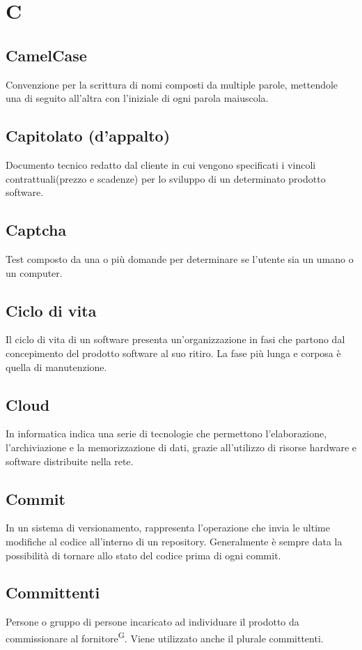 \section{C}

\subsection{CamelCase}
Convenzione per la scrittura di nomi composti da multiple parole, mettendole una di seguito all'altra con l'iniziale di ogni parola maiuscola. 

\subsection{Capitolato (d'appalto)}
Documento tecnico redatto dal cliente in cui vengono specificati i vincoli contrattuali(prezzo e scadenze) per lo sviluppo di un determinato prodotto software.

\subsection{Captcha}
Test composto da una o più domande per determinare se l'utente sia un umano o un computer.

\subsection{Ciclo di vita}
Il ciclo di vita di un software presenta un'organizzazione in fasi che partono dal concepimento del prodotto software al suo ritiro. La fase più lunga e corposa è quella di manutenzione.

\subsection{Cloud}
In informatica indica una serie di tecnologie che permettono l’elaborazione, l’archiviazione e la memorizzazione di dati, grazie all’utilizzo di risorse hardware e software distribuite nella rete.

\subsection{Commit}
In un sistema di versionamento, rappresenta l'operazione che invia le ultime modifiche al codice all'interno di un repository. Generalmente è sempre data la possibilità di tornare allo stato del codice prima di ogni commit.

\subsection{Committenti}
Persone o gruppo di persone incaricato ad individuare il prodotto da commissionare al fornitore\textsuperscript{G}. Viene utilizzato anche il plurale committenti.

